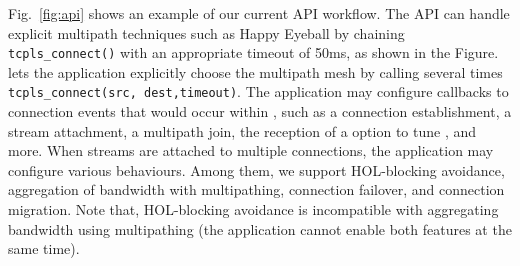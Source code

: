 Fig.~\ref{fig:api} shows an example of our current API workflow. The API can
handle explicit multipath techniques such as Happy Eyeball by chaining
\texttt{tcpls\_connect()} with an appropriate timeout of 50ms, as shown in the
Figure. \tcpls lets the application explicitly choose the multipath mesh by
calling several times \texttt{tcpls\_connect(src, dest,timeout)}. The
application may configure callbacks to connection events that would occur within
\tcpls, such as a connection establishment, a stream attachment, a multipath
join, the reception of a \tcp option to tune \tcp, and more. When
streams are attached to multiple \tcp connections, the application may configure
various \tcpls behaviours. Among them, we support HOL-blocking avoidance,
aggregation of bandwidth with multipathing, connection failover, and connection
migration. Note that, HOL-blocking avoidance is incompatible with
aggregating bandwidth using multipathing (the application cannot enable both
features at the same time).





